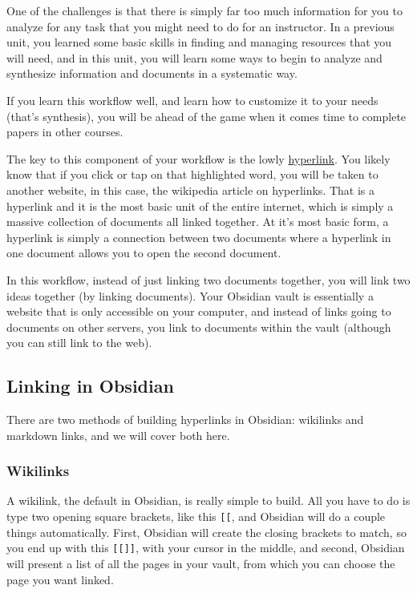 \documentclass[
]{book}
\theoremstyle{definition}
\theoremstyle{definition}
\theoremstyle{definition}
\theoremstyle{definition}
\theoremstyle{remark}
\begin{document}
One of the challenges is that there is simply far too much information for you to analyze for any task that you might need to do for an instructor. In a previous unit, you learned some basic skills in finding and managing resources that you will need, and in this unit, you will learn some ways to begin to analyze and synthesize information and documents in a systematic way.

If you learn this workflow well, and learn how to customize it to your needs (that's synthesis), you will be ahead of the game when it comes time to complete papers in other courses.

The key to this component of your workflow is the lowly \href{https://en.wikipedia.org/wiki/Hyperlink}{hyperlink}. You likely know that if you click or tap on that highlighted word, you will be taken to another website, in this case, the wikipedia article on hyperlinks. That is a hyperlink and it is the most basic unit of the entire internet, which is simply a massive collection of documents all linked together. At it's most basic form, a hyperlink is simply a connection between two documents where a hyperlink in one document allows you to open the second document.

In this workflow, instead of just linking two documents together, you will link two ideas together (by linking documents). Your Obsidian vault is essentially a website that is only accessible on your computer, and instead of links going to documents on other servers, you link to documents within the vault (although you can still link to the web).

\hypertarget{linking-in-obsidian}{%
\subsection*{Linking in Obsidian}\label{linking-in-obsidian}}

There are two methods of building hyperlinks in Obsidian: wikilinks and markdown links, and we will cover both here.

\hypertarget{wikilinks}{%
\subsubsection*{Wikilinks}\label{wikilinks}}

A wikilink, the default in Obsidian, is really simple to build. All you have to do is type two opening square brackets, like this \texttt{{[}{[}}, and Obsidian will do a couple things automatically. First, Obsidian will create the closing brackets to match, so you end up with this \texttt{{[}{[}{]}{]}}, with your cursor in the middle, and second, Obsidian will present a list of all the pages in your vault, from which you can choose the page you want linked.
\end{document}
